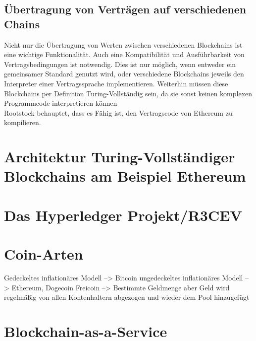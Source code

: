 \subsection{Übertragung von Verträgen auf verschiedenen Chains}
Nicht nur die Übertragung von Werten zwischen verschiedenen Blockchains ist eine wichtige Funktionalität. Auch eine Kompatibilität und Ausführbarkeit von Vertragsbedingungen ist notwendig. Dies ist nur möglich, wenn entweder ein gemeinsamer Standard genutzt wird, oder verschiedene Blockchains jeweils den Interpreter einer Vertragssprache implementieren. Weiterhin müssen diese Blockchains per Definition Turing-Vollständig sein, da sie sonst keinen komplexen Programmcode interpretieren können \\
Rootstock behauptet, dass es Fähig ist, den Vertragscode von Ethereum zu kompilieren. \cite{Rootstock.2016}
\section{Architektur Turing-Vollständiger Blockchains am Beispiel Ethereum}
\section{Das Hyperledger Projekt/R3CEV }



\section{Coin-Arten}
Gedeckeltes inflationäres Modell --> Bitcoin
ungedeckeltes inflationäres Modell --> Ethereum, Dogecoin
Freicoin --> Bestimmte Geldmenge aber Geld wird regelmäßig von allen Kontenhaltern abgezogen und wieder dem Pool hinzugefügt
\section{Blockchain-as-a-Service}
